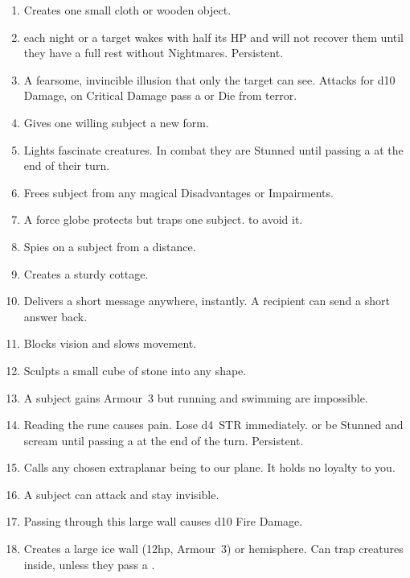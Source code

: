 \documentclass[itdr]{subfiles}
\begin{document}
\begin{enumerate}
	\item {} Creates one small cloth or wooden object.
	\vfill
	\break
	\item {}  each night or a target wakes with half its HP and will not recover them until they have a full rest without Nightmares. Persistent.
	\item {} A fearsome, invincible illusion that only the target can see. Attacks for d10 Damage, on Critical Damage pass a  or Die from terror.
	\item {} Gives one willing subject a new form.
	\item {} Lights fascinate creatures. In combat they are Stunned until passing a  at the end of their turn.
	\item {} Frees subject from any magical Disadvantages or Impairments.
	\item {} A force globe protects but traps one subject.  to avoid it.
	\item {} Spies on a subject from a distance.
	\item {} Creates a sturdy cottage.
	\item {} Delivers a short message anywhere, instantly. A recipient can send a short answer back.
	\item {} Blocks vision and slows movement.
	\item {} Sculpts a small cube of stone into any shape.
	\item {} A subject gains Armour~3 but running and swimming are impossible.
	\item {} Reading the rune causes pain. Lose d4~STR immediately.  or be Stunned and scream until passing a  at the end of the turn. Persistent.
	\item {} Calls any chosen extraplanar being to our plane. It holds no loyalty to you.
	\item {} A subject can attack and stay invisible.
	\item {} Passing through this large wall causes d10 Fire Damage.
	\item {} Creates a large ice wall (12hp, Armour~3) or hemisphere. Can trap creatures inside, unless they pass a .
\end{enumerate}
\end{document}
